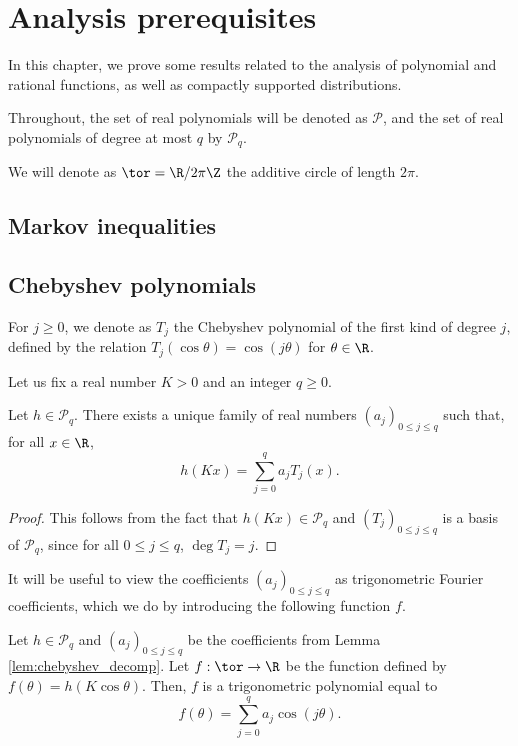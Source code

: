 \chapter{Analysis prerequisites}

In this chapter, we prove some results related to the analysis of polynomial and rational
functions, as well as compactly supported distributions.

Throughout, the set of real polynomials will be denoted as $\mathcal{P}$, and
the set of real polynomials of degree at most $q$ by $\mathcal{P}_q$.

We will denote as $\tor = \R / 2 \pi\Z$ the additive circle of length $2 \pi$.

\section{Markov inequalities}

\section{Chebyshev polynomials}

For $j \geq 0$, we denote as $T_j$ the Chebyshev polynomial of the first kind of degree $j$,
defined by the relation $T_j(\cos \theta) = \cos(j \theta)$ for $\theta \in \R$.

Let us fix a real number $K > 0$ and an integer $q \geq 0$.

\begin{lemma}
  \label{lem:chebyshev_decomp}
  Let $h \in \mathcal{P}_q$.
  There exists a unique family of real numbers $(a_j)_{0 \leq j \leq q}$ such that,
  for all $x \in \R$,
  \begin{equation*}
    h(Kx) = \sum_{j=0}^q a_j T_j (x).
  \end{equation*}
\end{lemma}

\begin{proof}
  This follows from the fact that $h(Kx) \in \mathcal{P}_q$ and $(T_j)_{0 \leq j \leq q}$ is a basis of $\mathcal{P}_q$,
  since for all $0 \leq j \leq q$, $\deg T_j = j$.
\end{proof}

It will be useful to view the coefficients $(a_j)_{0 \leq j \leq q}$ as trigonometric
Fourier coefficients, which we do by introducing the following function $f$.

\begin{lemma}
  \label{lem:f_def}
  Let $h \in \mathcal{P}_q$ and $(a_j)_{0 \leq j \leq q}$ be the coefficients from Lemma
  \ref{lem:chebyshev_decomp}.
  Let $f : \tor \rightarrow \R$ be the function defined by $f(\theta) = h(K \cos \theta)$.
  Then, $f$ is a trigonometric polynomial equal to
  \begin{equation*}
    f(\theta)
    =
      \sum_{j=0}^q a_j \cos(j \theta).
 \end{equation*}
\end{lemma}


